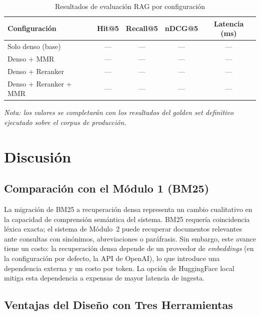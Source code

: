 \documentclass[conference]{IEEEtran}
\begin{document}
\begin{table}[ht]
\centering
\caption{Resultados de evaluación RAG por configuración}
\label{tab:resultados}
\setlength{\tabcolsep}{3pt}
\begin{tabular}{@{}lcccc@{}}
\toprule
\textbf{Configuración} & \textbf{Hit@5} & \textbf{Recall@5}
                       & \textbf{nDCG@5} & \textbf{Latencia (ms)} \\
\midrule
Solo denso (base)       & --- & --- & --- & --- \\
Denso + MMR             & --- & --- & --- & --- \\
Denso + Reranker        & --- & --- & --- & --- \\
Denso + Reranker + MMR  & --- & --- & --- & --- \\
\bottomrule
\end{tabular}
\end{table}

\textit{Nota: los valores se completarán con los resultados del \textit{golden set}
definitivo ejecutado sobre el corpus de producción.}

\section{Discusión}
\label{sec:disc}

\subsection{Comparación con el Módulo 1 (BM25)}

La migración de BM25 a recuperación densa representa un cambio cualitativo
en la capacidad de comprensión semántica del sistema. BM25 requería coincidencia
léxica exacta; el sistema de Módulo~2 puede recuperar documentos relevantes ante
consultas con sinónimos, abreviaciones o paráfrasis. Sin embargo, este avance
tiene un costo: la recuperación densa depende de un proveedor de
\textit{embeddings} (en la configuración por defecto, la API de OpenAI), lo que
introduce una dependencia externa y un costo por token. La opción de HuggingFace
local mitiga esta dependencia a expensas de mayor latencia de ingesta.

\subsection{Ventajas del Diseño con Tres Herramientas}
\end{document}

